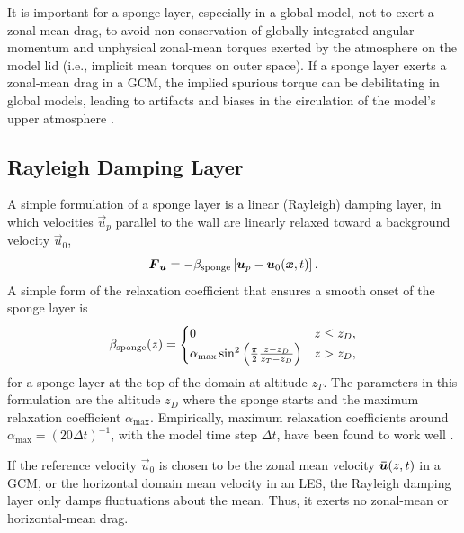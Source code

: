 \documentclass{report}
\begin{document}
It is important for a sponge layer, especially in a global model, not to exert a zonal-mean drag, to avoid non-conservation of globally integrated angular momentum and unphysical zonal-mean torques exerted by the atmosphere on the model lid (i.e., implicit mean torques on outer space). If a sponge layer exerts a zonal-mean drag in a GCM, the implied spurious torque can be debilitating in global models, leading to artifacts and biases in the circulation of the model's upper atmosphere \citep[e.g.,][]{Shepherd96a}. 

\subsection{Rayleigh Damping Layer}

A simple formulation of a sponge layer is a linear (Rayleigh) damping layer, in which velocities $\vec{u}_p$ parallel to the wall are linearly relaxed toward a background velocity $\vec{u}_0$,
\begin{equation*}
\vec{F}_{\vec{u}} = -\beta_{\rm sponge} \left[\vec{u}_p - \vec{u}_0(\vec{x}, t)\right].
\end{equation*}
A simple form of the relaxation coefficient that ensures a smooth onset of the sponge layer is \citep{klemp:1978a}
\begin{equation}\label{e:spongeDurran}
\beta_{\rm sponge}(z) =  
  \begin{cases}
    0 &  z\leq z_D,\\
    \alpha_{\max} \sin^2 \left( \frac{\pi}{2}\frac{z - z_D}{z_T - z_D} \right) & z > z_D,
    \end{cases}
\end{equation}
for a sponge layer at the top of the domain at altitude $z_T$. The parameters in this formulation are the altitude $z_D$ where the sponge starts and the maximum relaxation coefficient $\alpha_{\max}$. Empirically, maximum relaxation coefficients around $\alpha_{\max} = (20 \Delta t)^{-1}$, with the model time step $\Delta t$, have been found to work well \citep{Jablonowski11a}.

If the reference velocity $\vec{u}_0$ is chosen to be the zonal mean velocity $\vec{\Bar u}(z, t)$ in a GCM, or the horizontal domain mean velocity in an LES, the Rayleigh damping layer only damps fluctuations about the mean. Thus, it exerts no zonal-mean or horizontal-mean drag.  
\end{document}
